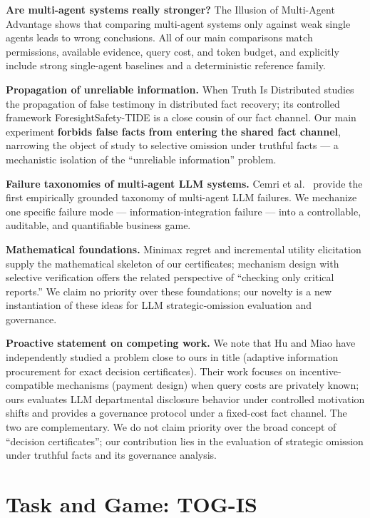 \documentclass[letterpaper]{article}
\begin{document}
\textbf{Are multi-agent systems really stronger?} The Illusion of Multi-Agent Advantage \cite{jwalapuram2026illusion} shows that comparing multi-agent systems only against weak single agents leads to wrong conclusions. All of our main comparisons match permissions, available evidence, query cost, and token budget, and explicitly include strong single-agent baselines and a deterministic reference family.

\textbf{Propagation of unreliable information.} When Truth Is Distributed \cite{yan2026truth} studies the propagation of false testimony in distributed fact recovery; its controlled framework ForesightSafety-TIDE is a close cousin of our fact channel. Our main experiment \textbf{forbids false facts from entering the shared fact channel}, narrowing the object of study to selective omission under truthful facts --- a mechanistic isolation of the ``unreliable information'' problem.

\textbf{Failure taxonomies of multi-agent LLM systems.} Cemri et al.\ \cite{cemri2025fail} provide the first empirically grounded taxonomy of multi-agent LLM failures. We mechanize one specific failure mode --- information-integration failure --- into a controllable, auditable, and quantifiable business game.

\textbf{Mathematical foundations.} Minimax regret and incremental utility elicitation \cite{wang2003,boutilier2006,braziunas2007} supply the mathematical skeleton of our certificates; mechanism design with selective verification \cite{fotakis2016} offers the related perspective of ``checking only critical reports.'' We claim no priority over these foundations; our novelty is a new instantiation of these ideas for LLM strategic-omission evaluation and governance.

\textbf{Proactive statement on competing work.} We note that Hu and Miao \cite{hu2026truthful} have independently studied a problem close to ours in title (adaptive information procurement for exact decision certificates). Their work focuses on incentive-compatible mechanisms (payment design) when query costs are privately known; ours evaluates LLM departmental disclosure behavior under controlled motivation shifts and provides a governance protocol under a fixed-cost fact channel. The two are complementary. We do not claim priority over the broad concept of ``decision certificates''; our contribution lies in the evaluation of strategic omission under truthful facts and its governance analysis.

\section{Task and Game: TOG-IS}
\end{document}
